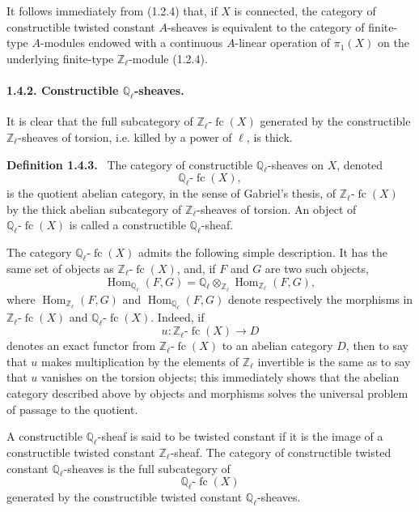\documentclass[11pt]{article}
\newenvironment{statement}[1]{\par\medskip\noindent\textbf{#1.}\ }{\par\medskip}
\DeclareMathOperator{\Hom}{Hom}
\providecommand{\Hom}{\operatorname{Hom}}
\providecommand{\fc}{\operatorname{fc}}
\begin{document}
It follows immediately from (1.2.4) that, if \(X\) is connected, the category of constructible twisted constant \(A\)-sheaves is equivalent to the category of finite-type \(A\)-modules endowed with a continuous \(A\)-linear operation of \(\pi_1(X)\) on the underlying finite-type \(\mathbb Z_\ell\)-module (1.2.4).

\paragraph{1.4.2. Constructible \(\mathbb Q_\ell\)-sheaves.}
It is clear that the full subcategory of \(\mathbb Z_\ell\text{-}\fc(X)\) generated by the constructible \(\mathbb Z_\ell\)-sheaves of torsion, i.e. killed by a power of \(\ell\), is thick.

\begin{statement}{Definition 1.4.3}
The category of constructible \(\mathbb Q_\ell\)-sheaves on \(X\), denoted
\[
\mathbb Q_\ell\text{-}\fc(X),
\]
is the quotient abelian category, in the sense of Gabriel's thesis, of \(\mathbb Z_\ell\text{-}\fc(X)\) by the thick abelian subcategory of \(\mathbb Z_\ell\)-sheaves of torsion. An object of \(\mathbb Q_\ell\text{-}\fc(X)\) is called a constructible \(\mathbb Q_\ell\)-sheaf.
\end{statement}

The category \(\mathbb Q_\ell\text{-}\fc(X)\) admits the following simple description. It has the same set of objects as \(\mathbb Z_\ell\text{-}\fc(X)\), and, if \(F\) and \(G\) are two such objects,
\[
\Hom_{\mathbb Q_\ell}(F,G)
=\mathbb Q_\ell\otimes_{\mathbb Z_\ell}\Hom_{\mathbb Z_\ell}(F,G),
\]
where \(\Hom_{\mathbb Z_\ell}(F,G)\) and \(\Hom_{\mathbb Q_\ell}(F,G)\) denote respectively the morphisms in \(\mathbb Z_\ell\text{-}\fc(X)\) and \(\mathbb Q_\ell\text{-}\fc(X)\). Indeed, if
\[
u:\mathbb Z_\ell\text{-}\fc(X)\longrightarrow D
\]
denotes an exact functor from \(\mathbb Z_\ell\text{-}\fc(X)\) to an abelian category \(D\), then to say that \(u\) makes multiplication by the elements of \(\mathbb Z_\ell\) invertible is the same as to say that \(u\) vanishes on the torsion objects; this immediately shows that the abelian category described above by objects and morphisms solves the universal problem of passage to the quotient.

A constructible \(\mathbb Q_\ell\)-sheaf is said to be twisted constant if it is the image of a constructible twisted constant \(\mathbb Z_\ell\)-sheaf. The category of constructible twisted constant \(\mathbb Q_\ell\)-sheaves is the full subcategory of
\[
\mathbb Q_\ell\text{-}\fc(X)
\]
generated by the constructible twisted constant \(\mathbb Q_\ell\)-sheaves.
\end{document}
